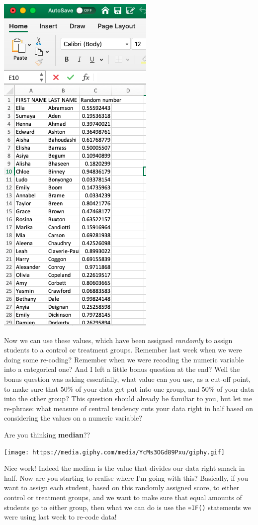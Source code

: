 \documentclass[
]{book}
\begin{document}
\includegraphics{imgs/rand_nums.png}

Now we can use these values, which have been assigned \emph{randomly} to assign students to a control or treatment groups. Remember last week when we were doing some re-coding? Remember when we were recoding the numeric variable into a categorical one? And I left a little bonus question at the end? Well the bonus question was asking essentially, what value can you use, as a cut-off point, to make sure that 50\% of your data get put into one group, and 50\% of your data into the other group? This question should already be familiar to you, but let me re-phrase: what measure of central tendency cuts your data right in half based on considering the values on a numeric variable?

Are you thinking \textbf{median}??

\texttt{[image: https://media.giphy.com/media/YcMs3OGd89Pxu/giphy.gif]}

Nice work! Indeed the median is the value that divides our data right smack in half. Now are you starting to realise where I'm going with this? Basically, if you want to assign each student, based on this randomly assigned score, to either control or treatment groups, and we want to make sure that equal amounts of students go to either group, then what we can do is use the \texttt{=IF()} statements we were using last week to re-code data!
\end{document}
